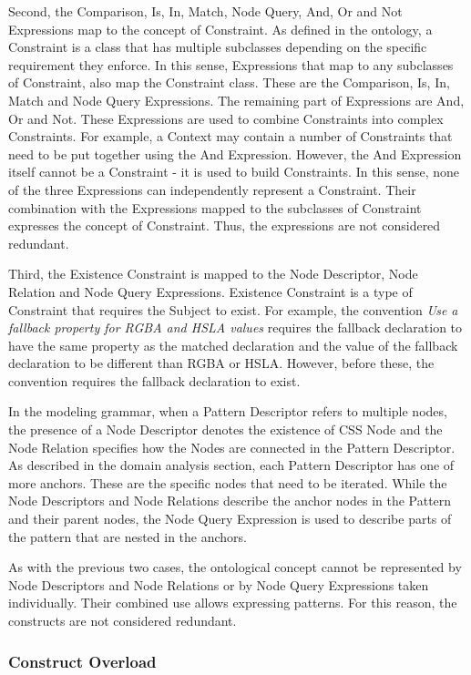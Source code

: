 \documentclass[parskip=full]{uvamscse}
\begin{document}
Second, the Comparison, Is, In, Match, Node Query, And, Or and Not Expressions map to the concept of
Constraint. As defined in the ontology, a Constraint is a class that has multiple subclasses
depending on the specific requirement they enforce. In this sense, Expressions that map to any
subclasses of Constraint, also map the Constraint class. These are the Comparison, Is, In, Match and
Node Query Expressions. The remaining part of Expressions are And, Or and Not. These Expressions are
used to combine Constraints into complex Constraints. For example, a Context may contain a number of
Constraints that need to be put together using the And Expression. However, the And Expression
itself cannot be a Constraint - it is used to build Constraints. In this sense, none of the three
Expressions can independently represent a Constraint. Their combination with the Expressions mapped
to the subclasses of Constraint expresses the concept of Constraint. Thus, the expressions are not
considered redundant.

Third, the Existence Constraint is mapped to the Node Descriptor, Node Relation and Node Query
Expressions. Existence Constraint is a type of Constraint that requires the Subject to exist. For
example, the convention \textit{Use a fallback property for RGBA and HSLA values} requires the
fallback declaration to have the same property as the matched declaration and the value of the
fallback declaration to be different than RGBA or HSLA. However, before these, the convention
requires the fallback declaration to exist.

In the modeling grammar, when a Pattern Descriptor refers to multiple nodes, the presence of a Node
Descriptor denotes the existence of CSS Node and the Node Relation specifies how the Nodes are
connected in the Pattern Descriptor. As described in the domain analysis section, each Pattern
Descriptor has one of more anchors. These are the specific nodes that need to be iterated. While the
Node Descriptors and Node Relations describe the anchor nodes in the Pattern and their parent nodes,
the Node Query Expression is used to describe parts of the pattern that are nested in the anchors.

As with the previous two cases, the ontological concept cannot be represented by Node Descriptors
and Node Relations or by Node Query Expressions taken individually. Their combined use allows
expressing patterns. For this reason, the constructs are not considered redundant.


\subsubsection{Construct Overload}
\end{document}
